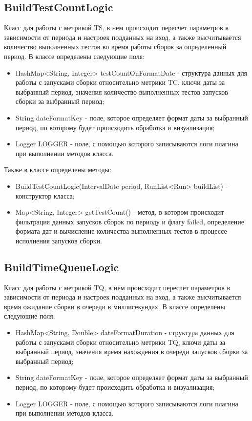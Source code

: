\subsection{BuildTestCountLogic}

Класс для работы с метрикой TS, в нем происходит пересчет параметров в зависимости от периода и настроек подданных на вход, а также высчитывается количество выполненных тестов во время работы сборок за определенный период. В классе определены следующие поля:

\begin{itemize}
	\item HashMap<String, Integer> testCountOnFormatDate - структура данных для работы с запусками сборки относительно метрики TC, ключи даты за выбранный период, значения количество выполненных тестов запусков сборки за выбранный период;
	\item String dateFormatKey - поле, которое определяет формат даты за выбранный период, по которому будет происходить обработка и визуализация;
	\item Logger LOGGER - поле, с помощью которого записываются логи плагина при выполнении методов класса.
\end{itemize}

Также в классе определены методы:

\begin{itemize}
	\item BuildTestCountLogic(IntervalDate period, RunList<Run> buildList) - конструктор класса;
	\item Map<String, Integer> getTestCount() - метод, в котором происходит фильтрация данных запусков сборок по периоду и флагу failed, определение формата дат и вычисление количества выполненных тестов в процессе исполнения запусков сборки.
\end{itemize}

\subsection{BuildTimeQueueLogic}

Класс для работы с метрикой TQ, в нем происходит пересчет параметров в зависимости от периода и настроек подданных на вход, а также высчитывается время ожидание сборки в очереди в миллисекундах. В классе определены следующие поля:

\begin{itemize}
	\item HashMap<String, Double> dateFormatDuration - структура данных для работы с запусками сборки относительно метрики TQ, ключи даты за выбранный период, значения время нахождения в очереди запусков сборки за выбранный период;
	\item String dateFormatKey - поле, которое определяет формат даты за выбранный период, по которому будет происходить обработка и визуализация;
	\item Logger LOGGER - поле, с помощью которого записываются логи плагина при выполнении методов класса.
\end{itemize}

